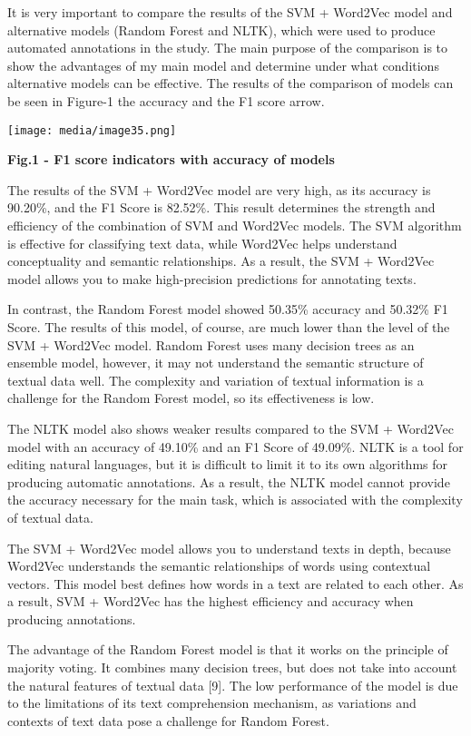\documentclass[
]{article}
\begin{document}
It is very important to compare the results of the SVM + Word2Vec model
and alternative models (Random Forest and NLTK), which were used to
produce automated annotations in the study. The main purpose of the
comparison is to show the advantages of my main model and determine
under what conditions alternative models can be effective. The results
of the comparison of models can be seen in Figure-1 the accuracy and the
F1 score arrow.

\texttt{[image: media/image35.png]}

\textbf{Fig.1 - F1 score indicators with accuracy of models}

The results of the SVM + Word2Vec model are very high, as its accuracy
is 90.20\%, and the F1 Score is 82.52\%. This result determines the
strength and efficiency of the combination of SVM and Word2Vec models.
The SVM algorithm is effective for classifying text data, while Word2Vec
helps understand conceptuality and semantic relationships. As a result,
the SVM + Word2Vec model allows you to make high-precision predictions
for annotating texts.

In contrast, the Random Forest model showed 50.35\% accuracy and 50.32\%
F1 Score. The results of this model, of course, are much lower than the
level of the SVM + Word2Vec model. Random Forest uses many decision
trees as an ensemble model, however, it may not understand the semantic
structure of textual data well. The complexity and variation of textual
information is a challenge for the Random Forest model, so its
effectiveness is low.

The NLTK model also shows weaker results compared to the SVM + Word2Vec
model with an accuracy of 49.10\% and an F1 Score of 49.09\%. NLTK is a
tool for editing natural languages, but it is difficult to limit it to
its own algorithms for producing automatic annotations. As a result, the
NLTK model cannot provide the accuracy necessary for the main task,
which is associated with the complexity of textual data.

The SVM + Word2Vec model allows you to understand texts in depth,
because Word2Vec understands the semantic relationships of words using
contextual vectors. This model best defines how words in a text are
related to each other. As a result, SVM + Word2Vec has the highest
efficiency and accuracy when producing annotations.

The advantage of the Random Forest model is that it works on the
principle of majority voting. It combines many decision trees, but does
not take into account the natural features of textual data {[}9{]}. The
low performance of the model is due to the limitations of its text
comprehension mechanism, as variations and contexts of text data pose a
challenge for Random Forest.
\end{document}
